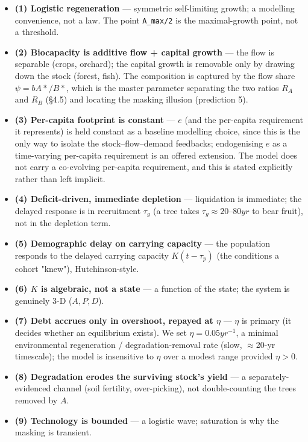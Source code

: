 \documentclass[11pt]{article}
\begin{document}
\begin{itemize}
\item \textbf{(1) Logistic regeneration} — symmetric self-limiting growth; a modelling convenience, not a law. The point \texttt{A\_max/2} is the maximal-growth point, not a threshold.
\item \textbf{(2) Biocapacity is additive flow + capital growth} — the flow is separable (crops, orchard); the capital growth is removable only by drawing down the stock (forest, fish). The composition is captured by the flow share $\psi{} = bA*/B*$, which is the master parameter separating the two ratios $R_{A}$ and $R_{B}$ (§4.5) and locating the masking illusion (prediction 5).
\item \textbf{(3) Per-capita footprint is constant} — $e$ (and the per-capita requirement it represents) is held constant as a baseline modelling choice, since this is the only way to isolate the stock–flow–demand feedbacks; endogenising $e$ as a time-varying per-capita requirement is an offered extension. The model does not carry a co-evolving per-capita requirement, and this is stated explicitly rather than left implicit.
\item \textbf{(4) Deficit-driven, immediate depletion} — liquidation is immediate; the delayed response is in recruitment $\tau{}_{g}$ (a tree takes $\tau{}_{g} \approx{} 20–80 yr$ to bear fruit), not in the depletion term.
\item \textbf{(5) Demographic delay on carrying capacity} — the population responds to the delayed carrying capacity $K(t-\tau{}_{p})$ (the conditions a cohort "knew"), Hutchinson-style.
\item \textbf{(6) $K$ is algebraic, not a state} — a function of the state; the system is genuinely 3-D ($A, P, D$).
\item \textbf{(7) Debt accrues only in overshoot, repayed at $\eta{}$} — $\eta{}$ is primary (it decides whether an equilibrium exists). We set $\eta{} = 0.05 yr^{-1}$, a minimal environmental regeneration / degradation-removal rate (slow, \ensuremath{\approx{}}20-yr timescale); the model is insensitive to $\eta{}$ over a modest range provided $\eta{} > 0$.
\item \textbf{(8) Degradation erodes the surviving stock's yield} — a separately-evidenced channel (soil fertility, over-picking), not double-counting the trees removed by $A$.
\item \textbf{(9) Technology is bounded} — a logistic wave; saturation is why the masking is transient.
\end{itemize}
\end{document}
